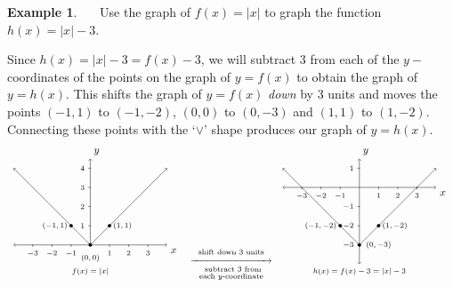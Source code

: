 \documentclass[12pt]{book}
\theoremstyle{definition}
\newtheorem{example}{Example}
\begin{document}
\begin{example}~~~Use the graph of $f(x) = |x|$ to graph the function $h(x) = |x|-3$.\par
Since $h(x) = |x| - 3 = f(x) -3$, we will subtract $3$ from each of the $y-$coordinates of the points on the graph of $y=f(x)$ to obtain the graph of $y = h(x)$.  This shifts the graph of $y=f(x)$ \textit{down} by $3$ units and moves the points $(-1,1)$ to $(-1,-2)$, $(0,0)$ to $(0,-3)$ and $(1,1)$ to $(1,-2)$.  Connecting these points with the `$\vee$' shape produces our graph of $y=h(x)$. 
\newpage
\[ \begin{array}{ccc}

\begin{tikzpicture}[xscale=0.65,yscale=0.65]
	\draw [<->](-4,0) -- coordinate (x axis mid) (4,0) node[below right] {$x$};
	\draw [<->](0,0) -- coordinate (x axis mid) (0,4.5) node[above right] {$y$};
	\draw [->] plot [domain=0:4, samples=100] (\x,{\x});
	\draw [->] plot [domain=0:-4, samples=100] (\x,{-\x});
	\draw[fill] (-1,1) circle (0.08);
	\draw[fill] (1,1) circle (0.08);
	\draw[fill] (0,0) circle (0.08);
	\foreach \x in {-3,...,-1}
	\draw (\x,1pt) -- (\x,-3pt)
	node[anchor=north] {\scriptsize $\x$};
	\foreach \x in {1,...,3}
	\draw (\x,1pt) -- (\x,-3pt)
	node[anchor=north] {\scriptsize $\x$};
	\foreach \y in {1,...,4}
	\draw (1pt,\y) -- (-3pt,\y) 
	node[anchor=east] {\scriptsize $\y$};
	\draw (1,1) node[right] {\scriptsize $(1,1)$}; 
	\draw (-1,1) node[left] {\scriptsize $(-1,1)$}; 
	\draw (0,-0.3) node[below] {\scriptsize $(0,0)$}; 
	\draw (0,-1) node[below] {\scriptsize $f(x)=|x|$};  
\end{tikzpicture}
&

\stackrel{\stackrel{\mbox{\scriptsize shift down $3$ units}}{\xrightarrow{\hspace{1in}}}}{\stackrel{\mbox{ \scriptsize subtract $3$ from}}{\mbox{\scriptsize each $y$-coordinate}}} 

&

\begin{tikzpicture}[xscale=0.65,yscale=0.65]
	\draw [<->](-4,0) -- coordinate (x axis mid) (4,0) node[below right] {$x$};
	\draw [<->](0,-4) -- coordinate (x axis mid) (0,1.5) node[above right] {$y$};
	\draw [->] plot [domain=0:4, samples=100] (\x,{\x-3});
	\draw [->] plot [domain=0:-4, samples=100] (\x,{-\x-3});
	\draw[fill] (-1,-2) circle (0.08);
	\draw[fill] (1,-2) circle (0.08);
	\draw[fill] (0,-3) circle (0.08);
	\foreach \x in {-3,...,-1}
	\draw (\x,1pt) -- (\x,-3pt)
	node[anchor=north] {\scriptsize $\x$};
	\foreach \x in {1,...,3}
	\draw (\x,1pt) -- (\x,-3pt)
	node[anchor=north] {\scriptsize $\x$};
	\foreach \y in {1}
	\draw (1pt,\y) -- (-3pt,\y) 
	node[anchor=east] {\scriptsize $\y$};
	\foreach \y in {-1,...,-3}
	\draw (1pt,\y) -- (-3pt,\y) 
	node[anchor=east] {\scriptsize $\y$};
	\draw (1,-2) node[right] {\scriptsize $(1,-2)$}; 
	\draw (-1,-2) node[left] {\scriptsize $(-1,-2)$}; 
	\draw (1,-3) node {\scriptsize $(0,-3)$}; 
	\draw (0,-4) node[below] {\scriptsize $h(x)=f(x)-3=|x|-3$};  
\end{tikzpicture}
\end{array}\]
\end{example}
\end{document}
